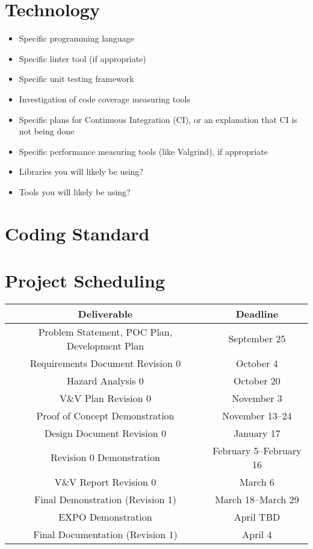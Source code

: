 \documentclass{article}
\begin{document}
\section{Technology}

\begin{itemize}
\item Specific programming language
\item Specific linter tool (if appropriate)
\item Specific unit testing framework
\item Investigation of code coverage measuring tools
\item Specific plans for Continuous Integration (CI), or an explanation that CI
  is not being done
\item Specific performance measuring tools (like Valgrind), if
  appropriate
\item Libraries you will likely be using?
\item Tools you will likely be using?
\end{itemize}

\section{Coding Standard}

\section{Project Scheduling}

\begin{center}
\begin{tabular}{ |c|c| } 
\hline
\textbf{Deliverable} & \textbf{Deadline} \\ 
 \hline
 Problem Statement, POC Plan, Development Plan & September 25 \\ 
 Requirements Document Revision 0  & October 4 \\
Hazard Analysis 0 & October 20  \\ 
 V\&V Plan Revision 0 & November 3 \\ 
Proof of Concept Demonstration & November 13--24 \\
Design Document Revision 0 & January 17 \\
Revision 0 Demonstration & February 5--February 16\\
V\&V Report Revision 0 & March 6 \\
Final Demonstration (Revision 1) & March 18--March 29 \\
EXPO Demonstration & April TBD \\
Final Documentation (Revision 1) & April 4 \\
 \hline
\end{tabular}
\end{center}

\end{document}
